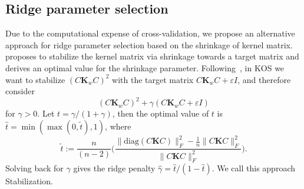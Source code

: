 \documentclass[twoside, onecolumn]{article}
\begin{document}



\subsection{Ridge parameter selection}\label{sec:RidgeSelect}


Due to the computational expense of cross-validation, we propose an alternative approach for ridge parameter selection based on the shrinkage of kernel matrix. \cite{lancewicki_regularization_2017} proposes to stabilize the kernel matrix via shrinkage towards a target matrix and derives an optimal value for the shrinkage parameter. Following~\cite{lancewicki_regularization_2017}, in KOS we want to stabilize $(C\mathbf{K}_wC)^{2}$ with the target matrix $C\mathbf{K}_w C+\varepsilon I$, and therefore consider
$$
(C\mathbf{K}_wC)^{2} + \gamma (C\mathbf{K}_w C+\varepsilon I)
$$
for $\gamma >0$. Let $t = \gamma/(1+\gamma)$, then the optimal value of $t$ is $\widehat t = \min(\max(0, \widetilde t), 1)$, where
$$\widetilde{t}:=\frac{n}{(n-2)}\bigg(\frac{\|\text{diag}(C\mathbf{K}C)\|_{F}^{2}-\frac{1}{n}\|C\mathbf{K}C\|_{F}^{2}}{\|C\mathbf{K}C\|_{F}^{2}}\bigg).$$
Solving back for $\gamma$ gives the ridge penalty $\widehat{\gamma}=\widehat{t}/(1-\widehat{t})$. We call this approach Stabilization.
\end{document}
